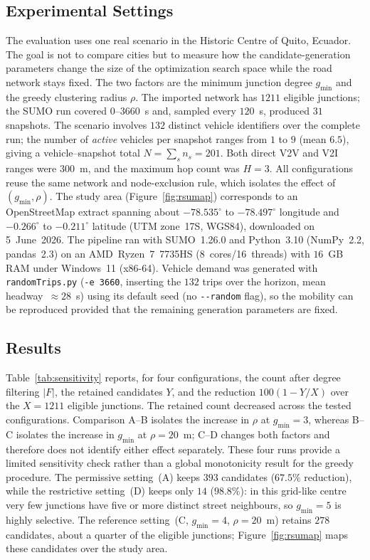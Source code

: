 \documentclass[engproc,proceedingpaper,submit,oneauthor]{Definitions/mdpi}
\begin{document}
\subsection{Experimental Settings}
The evaluation uses one real scenario in the Historic Centre of Quito, Ecuador. The
goal is not to compare cities but to measure how the candidate-generation parameters
change the size of the optimization search space while the road network stays fixed.
The two factors are the minimum junction degree $g_{\min}$ and the greedy clustering
radius $\rho$. The imported network has $1211$ eligible junctions; the SUMO run covered
$0$--$3660$~s and, sampled every $120$~s, produced $31$ snapshots. The scenario
involves $132$ distinct vehicle identifiers over the complete run; the number of
\emph{active} vehicles per snapshot ranges from $1$ to $9$ (mean $6.5$), giving a
vehicle--snapshot total $N=\sum_s n_s=201$. Both direct V2V and V2I ranges were
$300$~m, and the maximum hop count was $H=3$. All configurations reuse the same network
and node-exclusion rule, which isolates the effect of $(g_{\min},\rho)$. The study area
(Figure~\ref{fig:rsumap}) corresponds to an OpenStreetMap extract spanning about
$-78.535^{\circ}$ to $-78.497^{\circ}$ longitude and $-0.266^{\circ}$ to
$-0.211^{\circ}$ latitude (UTM zone~17S, WGS84), downloaded on 5~June~2026. The pipeline
ran with SUMO~1.26.0 and Python~3.10 (NumPy~2.2, pandas~2.3) on an AMD~Ryzen~7~7735HS
(8~cores/16~threads) with $16$~GB RAM under Windows~11 (x86-64). Vehicle demand was
generated with \texttt{randomTrips.py} (\texttt{-e 3660}, inserting the $132$ trips
over the horizon, mean headway~$\approx28$~s) using its default seed (no
\texttt{-{}-random} flag), so the mobility can be reproduced provided that the remaining
generation parameters are fixed.

\subsection{Results}
Table~\ref{tab:sensitivity} reports, for four configurations, the count after degree
filtering $|F|$, the retained candidates $Y$, and the reduction $100(1-Y/X)$ over the
$X=1211$ eligible junctions. The retained count decreased across the tested
configurations. Comparison A--B isolates the increase in $\rho$ at $g_{\min}=3$,
whereas B--C isolates the increase in $g_{\min}$ at $\rho=20$~m; C--D changes both
factors and therefore does not identify either effect separately. These four runs
provide a limited sensitivity check rather than a global monotonicity result for the
greedy procedure. The permissive setting~(A) keeps $393$ candidates ($67.5\%$
reduction), while the restrictive setting~(D) keeps only $14$ ($98.8\%$): in this
grid-like centre very few junctions have five or more distinct street neighbours, so
$g_{\min}=5$ is highly selective. The reference setting~(C, $g_{\min}=4$,
$\rho=20$~m) retains $278$ candidates, about a quarter of the eligible junctions;
Figure~\ref{fig:rsumap} maps these candidates over the study area.
\end{document}
